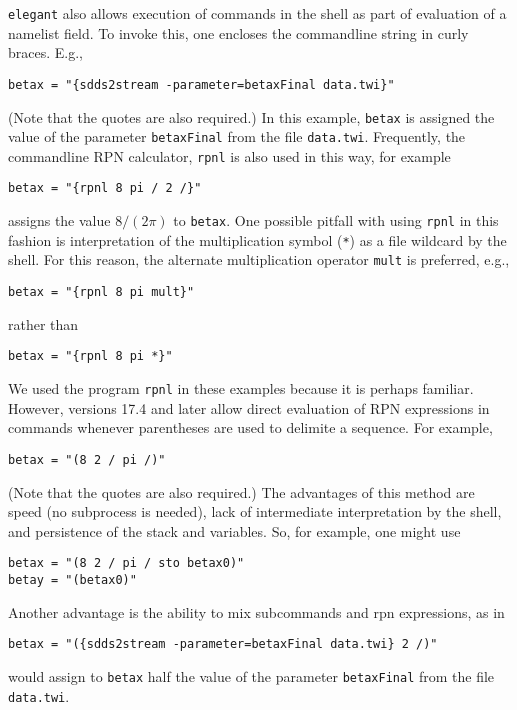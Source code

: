 \documentclass[11pt]{article}
\begin{document}
{\tt elegant} also allows execution of commands in the shell as part of
evaluation of a namelist field.  To invoke this, one encloses the commandline
string in curly braces.  E.g., 
\begin{verbatim}
betax = "{sdds2stream -parameter=betaxFinal data.twi}"
\end{verbatim}
(Note that the quotes are also required.)
In this example, \verb|betax| is assigned the value of the parameter {\tt betaxFinal} from
the file {\tt data.twi}.
Frequently, the commandline RPN calculator, {\tt rpnl} is also used in this way, for example
\begin{verbatim}
betax = "{rpnl 8 pi / 2 /}"
\end{verbatim}
assigns the value $8/(2 \pi)$ to {\tt betax}. One possible pitfall with using \verb|rpnl| in this
fashion is interpretation of the multiplication symbol (\verb|*|) as a file wildcard by the
shell.  For this reason, the alternate multiplication operator \verb|mult| is preferred, e.g.,
\begin{verbatim}
betax = "{rpnl 8 pi mult}"
\end{verbatim}
rather than
\begin{verbatim}
betax = "{rpnl 8 pi *}"
\end{verbatim}

We used the program {\tt rpnl} in these examples because it is perhaps familiar.  However, versions 17.4 and later
allow direct evaluation of RPN expressions in commands whenever parentheses are used to delimite a sequence.  For example, 
\begin{verbatim}
betax = "(8 2 / pi /)"
\end{verbatim}
(Note that the quotes are also required.)
The advantages of this method are speed (no subprocess is needed),
lack of intermediate interpretation by the shell, and persistence of
the stack and variables.  So, for example, one might use
\begin{verbatim}
betax = "(8 2 / pi / sto betax0)"
betay = "(betax0)"
\end{verbatim}
Another advantage is the ability to mix subcommands and rpn expressions, as in
\begin{verbatim}
betax = "({sdds2stream -parameter=betaxFinal data.twi} 2 /)"
\end{verbatim}
would assign to {\tt betax} half
the value of the parameter {\tt betaxFinal} from
the file {\tt data.twi}.


\begin{latexonly}
\newpage
\end{latexonly}
\end{document}
